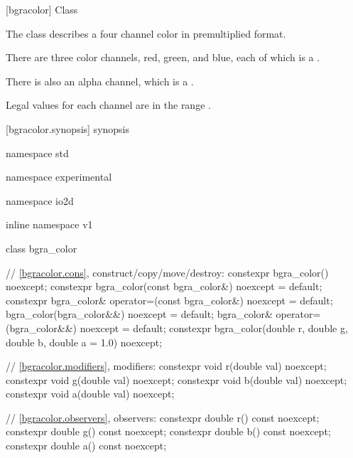  [bgracolor] {Class }

\pnum
{}
The class  describes a four channel color in premultiplied format.

\pnum
There are three color channels, red, green, and blue, each of which is a .

\pnum
There is also an alpha channel, which is a .

\pnum
Legal values for each channel are in the range .

%
 [bgracolor.synopsis] { synopsis}

\begin{codeblock}
namespace std { namespace experimental { namespace io2d { inline namespace v1 {
  class bgra_color {
    // \ref{bgracolor.cons}, construct/copy/move/destroy:
    constexpr bgra_color() noexcept;
    constexpr bgra_color(const bgra_color&) noexcept = default;
    constexpr bgra_color& operator=(const bgra_color&) noexcept = default;
    bgra_color(bgra_color&&) noexcept = default;
    bgra_color& operator=(bgra_color&&) noexcept = default;
    constexpr bgra_color(double r, double g, double b, double a = 1.0) noexcept;
  
    // \ref{bgracolor.modifiers}, modifiers:
    constexpr void r(double val) noexcept;
    constexpr void g(double val) noexcept;
    constexpr void b(double val) noexcept;
    constexpr void a(double val) noexcept;
    
    // \ref{bgracolor.observers}, observers:
    constexpr double r() const noexcept;
    constexpr double g() const noexcept;
    constexpr double b() const noexcept;
    constexpr double a() const noexcept;
    
}}}}}
\end{codeblock}
